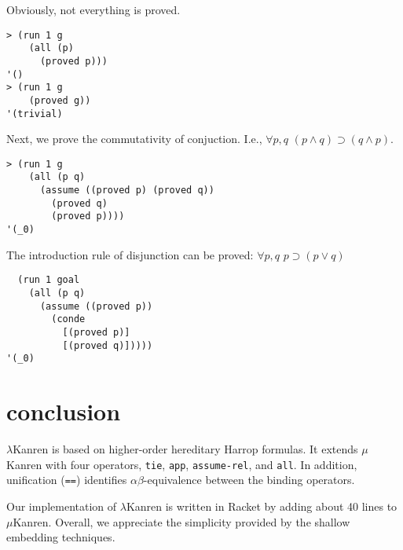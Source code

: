 \documentclass[acmlarge,review]{acmart}
\theoremstyle{definition}
\begin{document}
Obviously, not everything is proved.
\begin{lstlisting}
> (run 1 g
    (all (p)
      (proved p)))
'()
> (run 1 g
    (proved g))
'(trivial)
\end{lstlisting}

Next, we prove the commutativity of conjuction. I.e.,
  $\forall p,q \,\, (p \wedge q) \supset (q \wedge p)$.
\begin{lstlisting}
> (run 1 g
    (all (p q)
      (assume ((proved p) (proved q))
        (proved q)
        (proved p))))
'(_0)
\end{lstlisting}

The introduction rule of disjunction can be proved:
$\forall p,q \,\, p \supset (p \vee q)$
\begin{lstlisting}
  (run 1 goal
    (all (p q)
      (assume ((proved p))
        (conde
          [(proved p)]
          [(proved q)]))))
'(_0)
\end{lstlisting}


\section{conclusion}
$\lambda$Kanren is based on higher-order hereditary Harrop formulas.
It extends $\mu$Kanren with four operators, \texttt{tie},
\texttt{app}, \texttt{assume-rel}, and \texttt{all}. In addition, unification
(\texttt{==}) identifies $\alpha\beta$-equivalence between the binding
operators.

Our implementation of $\lambda$Kanren is written in Racket by adding
about 40 lines to $\mu$Kanren. Overall, we appreciate the simplicity
provided by the shallow embedding techniques.



\end{document}
